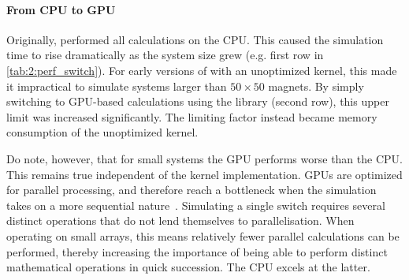 \paragraph{From CPU to GPU}
Originally, \hotspice performed all calculations on the CPU. %
This caused the simulation time to rise dramatically as the system size grew (e.g. first row in \cref{tab:2:perf_switch}).
For early versions of \hotspice with an unoptimized kernel, this made it impractical to simulate systems larger than $50 \times 50$ magnets.
By simply switching to GPU-based calculations using the  library (second row), this upper limit was increased significantly.
The limiting factor instead became memory consumption of the unoptimized kernel. \par
Do note, however, that for small systems the GPU performs worse than the CPU.
This remains true independent of the kernel implementation.
GPUs are optimized for parallel processing, and therefore reach a bottleneck when the simulation takes on a more sequential nature~\cite{owens2008gpu}.
Simulating a single switch requires several distinct operations that do not lend themselves to parallelisation.
When operating on small arrays, this means relatively fewer parallel calculations can be performed, thereby increasing the importance of being able to perform distinct mathematical operations in quick succession.
The CPU excels at the latter.

